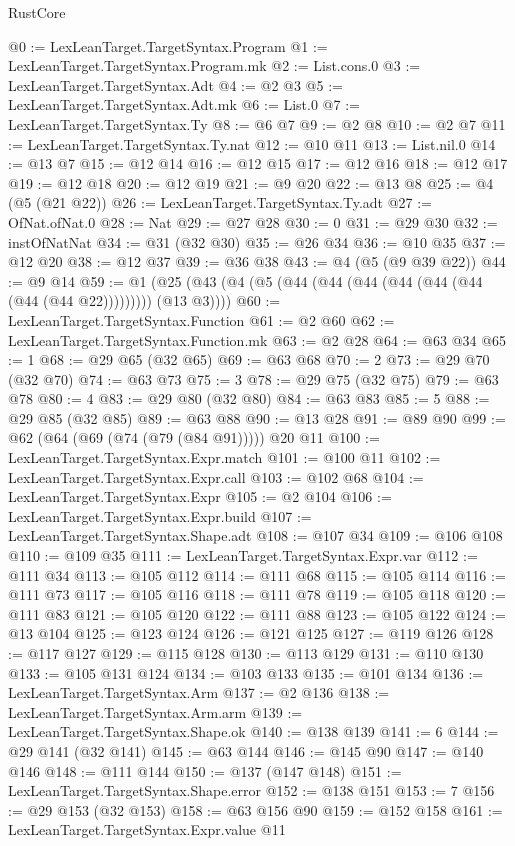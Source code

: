\begin{lexlean}{RustCore}
\begin{coremodule}
{\begin{coremodule}
{{{{{{{{{{{{{{{{{{{{{{{{{{{{{{{{{{{{{{{{{{{{{@0 := LexLeanTarget.TargetSyntax.Program
@1 := LexLeanTarget.TargetSyntax.Program.mk
@2 := List.cons.{0}
@3 := LexLeanTarget.TargetSyntax.Adt
@4 := @2 @3
@5 := LexLeanTarget.TargetSyntax.Adt.mk
@6 := List.{0}
@7 := LexLeanTarget.TargetSyntax.Ty
@8 := @6 @7
@9 := @2 @8
@10 := @2 @7
@11 := LexLeanTarget.TargetSyntax.Ty.nat
@12 := @10 @11
@13 := List.nil.{0}
@14 := @13 @7
@15 := @12 @14
@16 := @12 @15
@17 := @12 @16
@18 := @12 @17
@19 := @12 @18
@20 := @12 @19
@21 := @9 @20
@22 := @13 @8
@25 := @4 (@5 (@21 @22))
@26 := LexLeanTarget.TargetSyntax.Ty.adt
@27 := OfNat.ofNat.{0}
@28 := Nat
@29 := @27 @28
@30 := 0
@31 := @29 @30
@32 := instOfNatNat
@34 := @31 (@32 @30)
@35 := @26 @34
@36 := @10 @35
@37 := @12 @20
@38 := @12 @37
@39 := @36 @38
@43 := @4 (@5 (@9 @39 @22))
@44 := @9 @14
@59 := @1 (@25 (@43 (@4 (@5 (@44 (@44 (@44 (@44 (@44 (@44 (@44 (@44 @22))))))))) (@13 @3))))
@60 := LexLeanTarget.TargetSyntax.Function
@61 := @2 @60
@62 := LexLeanTarget.TargetSyntax.Function.mk
@63 := @2 @28
@64 := @63 @34
@65 := 1
@68 := @29 @65 (@32 @65)
@69 := @63 @68
@70 := 2
@73 := @29 @70 (@32 @70)
@74 := @63 @73
@75 := 3
@78 := @29 @75 (@32 @75)
@79 := @63 @78
@80 := 4
@83 := @29 @80 (@32 @80)
@84 := @63 @83
@85 := 5
@88 := @29 @85 (@32 @85)
@89 := @63 @88
@90 := @13 @28
@91 := @89 @90
@99 := @62 (@64 (@69 (@74 (@79 (@84 @91))))) @20 @11
@100 := LexLeanTarget.TargetSyntax.Expr.match
@101 := @100 @11
@102 := LexLeanTarget.TargetSyntax.Expr.call
@103 := @102 @68
@104 := LexLeanTarget.TargetSyntax.Expr
@105 := @2 @104
@106 := LexLeanTarget.TargetSyntax.Expr.build
@107 := LexLeanTarget.TargetSyntax.Shape.adt
@108 := @107 @34
@109 := @106 @108
@110 := @109 @35
@111 := LexLeanTarget.TargetSyntax.Expr.var
@112 := @111 @34
@113 := @105 @112
@114 := @111 @68
@115 := @105 @114
@116 := @111 @73
@117 := @105 @116
@118 := @111 @78
@119 := @105 @118
@120 := @111 @83
@121 := @105 @120
@122 := @111 @88
@123 := @105 @122
@124 := @13 @104
@125 := @123 @124
@126 := @121 @125
@127 := @119 @126
@128 := @117 @127
@129 := @115 @128
@130 := @113 @129
@131 := @110 @130
@133 := @105 @131 @124
@134 := @103 @133
@135 := @101 @134
@136 := LexLeanTarget.TargetSyntax.Arm
@137 := @2 @136
@138 := LexLeanTarget.TargetSyntax.Arm.arm
@139 := LexLeanTarget.TargetSyntax.Shape.ok
@140 := @138 @139
@141 := 6
@144 := @29 @141 (@32 @141)
@145 := @63 @144
@146 := @145 @90
@147 := @140 @146
@148 := @111 @144
@150 := @137 (@147 @148)
@151 := LexLeanTarget.TargetSyntax.Shape.error
@152 := @138 @151
@153 := 7
@156 := @29 @153 (@32 @153)
@158 := @63 @156 @90
@159 := @152 @158
@161 := LexLeanTarget.TargetSyntax.Expr.value @11
}}}}}}}}}}}}}}}}}}}}}}}}}}}}}}}}}}}}}}}}}}}}}
\end{coremodule}}
\end{coremodule}
\end{lexlean}
